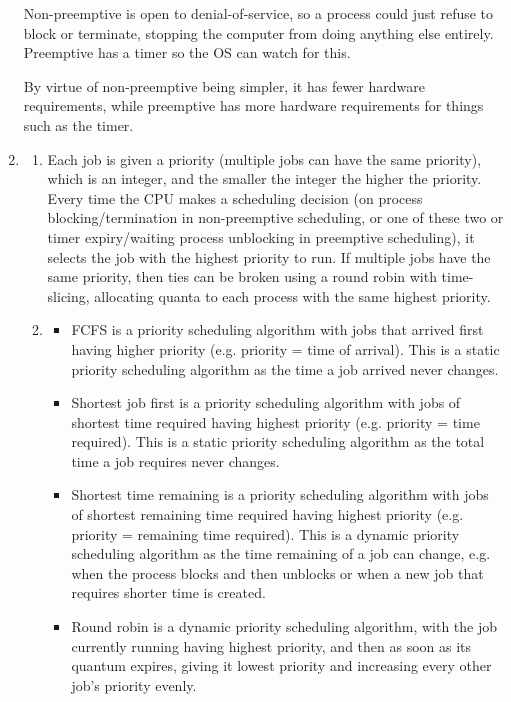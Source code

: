 \documentclass[12pt]{article}
\begin{document}
\begin{enumerate}
          Non-preemptive is open to denial-of-service, so a process could just refuse to block or terminate, stopping the computer from doing anything else entirely. Preemptive has a timer so the OS can watch for this.

          By virtue of non-preemptive being simpler, it has fewer hardware requirements, while preemptive has more hardware requirements for things such as the timer.
    \item \begin{enumerate}
              \item Each job is given a priority (multiple jobs can have the same priority), which is an integer, and the smaller the integer the higher the priority. Every time the CPU makes a scheduling decision (on process blocking/termination in non-preemptive scheduling, or one of these two or timer expiry/waiting process unblocking in preemptive scheduling), it selects the job with the highest priority to run. If multiple jobs have the same priority, then ties can be broken using a round robin with time-slicing, allocating quanta to each process with the same highest priority.
              \item \begin{itemize}
                        \item FCFS is a priority scheduling algorithm with jobs that arrived first having higher priority (e.g. priority = time of arrival). This is a static priority scheduling algorithm as the time a job arrived never changes.
                        \item Shortest job first is a priority scheduling algorithm with jobs of shortest time required having highest priority (e.g. priority = time required). This is a static priority scheduling algorithm as the total time a job requires never changes.
                        \item Shortest time remaining is a priority scheduling algorithm with jobs of shortest remaining time required having highest priority (e.g. priority = remaining time required). This is a dynamic priority scheduling algorithm as the time remaining of a job can change, e.g. when the process blocks and then unblocks or when a new job that requires shorter time is created.
                        \item Round robin is a dynamic priority scheduling algorithm, with the job currently running having highest priority, and then as soon as its quantum expires, giving it lowest priority and increasing every other job's priority evenly.

\end{itemize}
\end{enumerate}
\end{enumerate}
\end{document}
